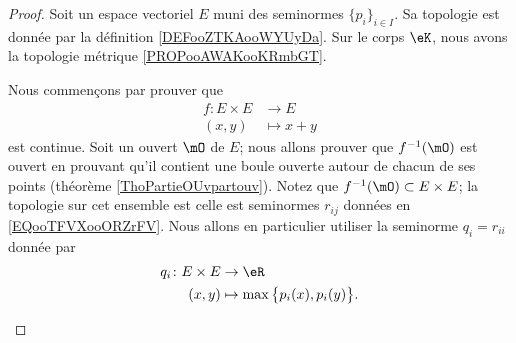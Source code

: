 \begin{proof}
	Soit un espace vectoriel \( E\) muni des seminormes \( \{ p_i \}_{i\in I}\). Sa topologie est donnée par la définition \ref{DEFooZTKAooWYUyDa}. Sur le corps \( \eK\), nous avons la topologie métrique \ref{PROPooAWAKooKRmbGT}.
	\begin{subproof}
		\spitem[Somme]

		Nous commençons par prouver que
		\begin{equation}
			\begin{aligned}
				f\colon E\times E & \to E       \\
				(x,y)             & \mapsto x+y
			\end{aligned}
		\end{equation}
		est continue. Soit un ouvert \( \mO\) de \( E\); nous allons prouver que \( f^{-1}(\mO)\) est ouvert en prouvant qu'il contient une boule ouverte autour de chacun de ses points (théorème \ref{ThoPartieOUvpartouv}). Notez que \( f^{-1}(\mO)\subset E\times E\); la topologie sur cet ensemble est celle est seminormes \( r_{ij}\) données en \eqref{EQooTFVXooORZrFV}. Nous allons en particulier utiliser la seminorme \( q_i=r_{ii}\) donnée par
		\begin{equation}        \label{EQooPDRPooZMDeoY}
			\begin{aligned}
				q_i\colon E\times E & \to \eR                                   \\
				(x,y)               & \mapsto \max\big\{ p_i(x),p_i(y)  \big\}.
			\end{aligned}
		\end{equation}


\end{subproof}
\end{proof}
